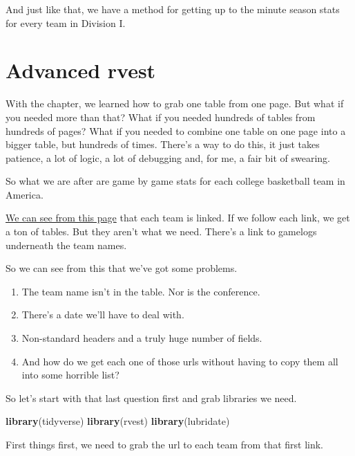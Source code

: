 \documentclass[]{book}
\newenvironment{Shaded}{\begin{snugshade}}{\end{snugshade}}
\newcommand{\KeywordTok}[1]{\textcolor[rgb]{0.13,0.29,0.53}{\textbf{#1}}}
\newcommand{\NormalTok}[1]{#1}
\providecommand{\tightlist}{%
  \setlength{\itemsep}{0pt}\setlength{\parskip}{0pt}}
\begin{document}
And just like that, we have a method for getting up to the minute season
stats for every team in Division I.

\chapter{Advanced rvest}\label{advanced-rvest}

With the chapter, we learned how to grab one table from one page. But
what if you needed more than that? What if you needed hundreds of tables
from hundreds of pages? What if you needed to combine one table on one
page into a bigger table, but hundreds of times. There's a way to do
this, it just takes patience, a lot of logic, a lot of debugging and,
for me, a fair bit of swearing.

So what we are after are game by game stats for each college basketball
team in America.

\href{https://www.sports-reference.com/cbb/seasons/2019-school-stats.html}{We
can see from this page} that each team is linked. If we follow each
link, we get a ton of tables. But they aren't what we need. There's a
link to gamelogs underneath the team names.

So we can see from this that we've got some problems.

\begin{enumerate}
\def\labelenumi{\arabic{enumi}.}
\tightlist
\item
  The team name isn't in the table. Nor is the conference.
\item
  There's a date we'll have to deal with.
\item
  Non-standard headers and a truly huge number of fields.
\item
  And how do we get each one of those urls without having to copy them
  all into some horrible list?
\end{enumerate}

So let's start with that last question first and grab libraries we need.

\begin{Shaded}
\begin{Highlighting}[]
\KeywordTok{library}\NormalTok{(tidyverse)}
\KeywordTok{library}\NormalTok{(rvest)}
\KeywordTok{library}\NormalTok{(lubridate)}
\end{Highlighting}
\end{Shaded}

First things first, we need to grab the url to each team from that first
link.
\end{document}
